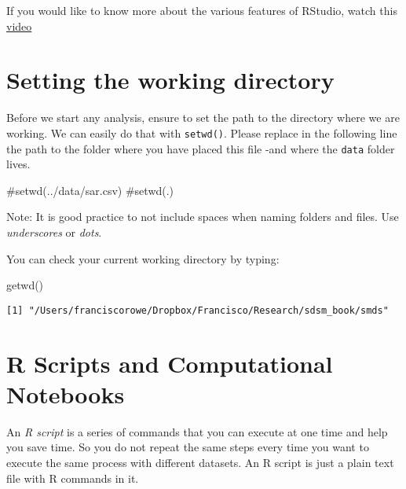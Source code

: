 \documentclass[
  letterpaper,
  krantz2]{style/krantz}
\newenvironment{Shaded}{\begin{snugshade}}{\end{snugshade}}
\newcommand{\CommentTok}[1]{\textcolor[rgb]{0.37,0.37,0.37}{#1}}
\newcommand{\FunctionTok}[1]{\textcolor[rgb]{0.28,0.35,0.67}{#1}}
\newcommand{\NormalTok}[1]{\textcolor[rgb]{0.00,0.23,0.31}{#1}}
\begin{document}
If you would like to know more about the various features of RStudio,
watch this \href{https://rstudio.com/products/rstudio/}{video}

\hypertarget{setting-the-working-directory}{%
\section{Setting the working
directory}\label{setting-the-working-directory}}

Before we start any analysis, ensure to set the path to the directory
where we are working. We can easily do that with \texttt{setwd()}.
Please replace in the following line the path to the folder where you
have placed this file -and where the \texttt{data} folder lives.

\begin{Shaded}
\begin{Highlighting}[]
\CommentTok{\#setwd(\textquotesingle{}../data/sar.csv\textquotesingle{})}
\CommentTok{\#setwd(\textquotesingle{}.\textquotesingle{})}
\end{Highlighting}
\end{Shaded}

Note: It is good practice to not include spaces when naming folders and
files. Use \emph{underscores} or \emph{dots}.

You can check your current working directory by typing:

\begin{Shaded}
\begin{Highlighting}[]
\FunctionTok{getwd}\NormalTok{()}
\end{Highlighting}
\end{Shaded}

\begin{verbatim}
[1] "/Users/franciscorowe/Dropbox/Francisco/Research/sdsm_book/smds"
\end{verbatim}

\hypertarget{r-scripts-and-computational-notebooks}{%
\section{R Scripts and Computational
Notebooks}\label{r-scripts-and-computational-notebooks}}

An \emph{R script} is a series of commands that you can execute at one
time and help you save time. So you do not repeat the same steps every
time you want to execute the same process with different datasets. An R
script is just a plain text file with R commands in it.
\end{document}
